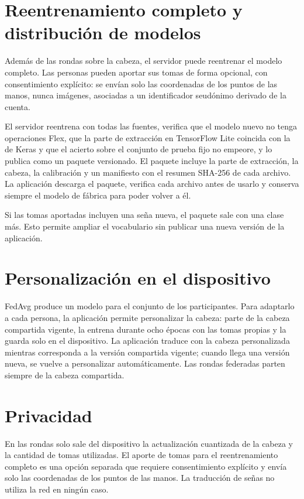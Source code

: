 \section{Reentrenamiento completo y distribución de modelos}

Además de las rondas sobre la cabeza, el servidor puede reentrenar el modelo completo. Las personas pueden aportar sus tomas de forma opcional, con consentimiento explícito: se envían solo las coordenadas de los puntos de las manos, nunca imágenes, asociadas a un identificador seudónimo derivado de la cuenta.

El servidor reentrena con todas las fuentes, verifica que el modelo nuevo no tenga operaciones Flex, que la parte de extracción en TensorFlow Lite coincida con la de Keras y que el acierto sobre el conjunto de prueba fijo no empeore, y lo publica como un paquete versionado. El paquete incluye la parte de extracción, la cabeza, la calibración y un manifiesto con el resumen SHA-256 de cada archivo. La aplicación descarga el paquete, verifica cada archivo antes de usarlo y conserva siempre el modelo de fábrica para poder volver a él.

Si las tomas aportadas incluyen una seña nueva, el paquete sale con una clase más. Esto permite ampliar el vocabulario sin publicar una nueva versión de la aplicación.

\section{Personalización en el dispositivo}

FedAvg produce un modelo para el conjunto de los participantes. Para adaptarlo a cada persona, la aplicación permite personalizar la cabeza: parte de la cabeza compartida vigente, la entrena durante ocho épocas con las tomas propias y la guarda solo en el dispositivo. La aplicación traduce con la cabeza personalizada mientras corresponda a la versión compartida vigente; cuando llega una versión nueva, se vuelve a personalizar automáticamente. Las rondas federadas parten siempre de la cabeza compartida.

\section{Privacidad}

En las rondas solo sale del dispositivo la actualización cuantizada de la cabeza y la cantidad de tomas utilizadas. El aporte de tomas para el reentrenamiento completo es una opción separada que requiere consentimiento explícito y envía solo las coordenadas de los puntos de las manos. La traducción de señas no utiliza la red en ningún caso.

